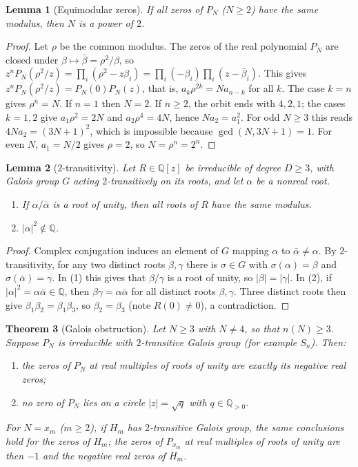 \documentclass[11pt,a4paper]{article}
\newtheorem{theorem}{Theorem}[section]
\newtheorem{lemma}[theorem]{Lemma}
\theoremstyle{definition}
\theoremstyle{remark}
\numberwithin{equation}{section}
\begin{document}
\begin{lemma}[Equimodular zeros]\label{B:C:lem-equimod}
If all zeros of $P_N$ ($N\ge2$) have the same modulus, then $N$ is a power of $2$.
\end{lemma}

\begin{proof}
Let $\rho$ be the common modulus.  The zeros of the real polynomial $P_N$ are
closed under $\beta\mapsto\bar\beta=\rho^2/\beta$, so
$z^nP_N(\rho^2/z)=\prod_i(\rho^2-z\beta_i)=\prod_i(-\beta_i)\prod_i(z-\bar\beta_i)$.
This gives $z^nP_N(\rho^2/z)=P_N(0)P_N(z)$, that is, $a_k\rho^{2k}=Na_{n-k}$ for
all $k$.  The case $k=n$ gives $\rho^n=N$.  If $n=1$ then $N=2$.  If $n\ge2$,
the orbit ends with $4,2,1$; the cases $k=1,2$ give $a_1\rho^2=2N$ and
$a_2\rho^4=4N$, hence $Na_2=a_1^2$.  For odd $N\ge3$ this reads
$4Na_2=(3N+1)^2$, which is impossible because $\gcd(N,3N+1)=1$.  For even $N$,
$a_1=N/2$ gives $\rho=2$, so $N=\rho^n=2^n$.
\end{proof}

\begin{lemma}[$2$-transitivity]\label{B:C:lem-2trans}
Let $R\in\mathbb Q[z]$ be irreducible of degree $D\ge3$, with Galois group $G$
acting $2$-transitively on its roots, and let $\alpha$ be a nonreal root.
\begin{enumerate}
\item If $\alpha/\bar\alpha$ is a root of unity, then all roots of $R$ have the
same modulus.
\item $|\alpha|^2\notin\mathbb Q$.
\end{enumerate}
\end{lemma}

\begin{proof}
Complex conjugation induces an element of $G$ mapping $\alpha$ to
$\bar\alpha\ne\alpha$.  By $2$-transitivity, for any two distinct roots
$\beta,\gamma$ there is $\sigma\in G$ with $\sigma(\alpha)=\beta$ and
$\sigma(\bar\alpha)=\gamma$.  In (1) this gives that $\beta/\gamma$ is a root
of unity, so $|\beta|=|\gamma|$.  In (2), if $|\alpha|^2=\alpha\bar\alpha\in\mathbb Q$,
then $\beta\gamma=\alpha\bar\alpha$ for all distinct roots $\beta,\gamma$.
Three distinct roots then give $\beta_1\beta_2=\beta_1\beta_3$, so
$\beta_2=\beta_3$ (note $R(0)\ne0$), a contradiction.
\end{proof}

\begin{theorem}[Galois obstruction]\label{B:C:thm-Q7}
Let $N\ge3$ with $N\ne4$, so that $n(N)\ge3$.  Suppose $P_N$ is irreducible with
$2$-transitive Galois group (for example $S_n$).  Then:
\begin{enumerate}
\item the zeros of $P_N$ at real multiples of roots of unity are exactly its
negative real zeros;
\item no zero of $P_N$ lies on a circle $|z|=\sqrt q$ with $q\in\mathbb Q_{>0}$.
\end{enumerate}
For $N=x_m$ ($m\ge2$), if $H_m$ has $2$-transitive Galois group, the same
conclusions hold for the zeros of $H_m$; the zeros of $P_{x_m}$ at real multiples
of roots of unity are then $-1$ and the negative real zeros of $H_m$.
\end{theorem}
\end{document}
